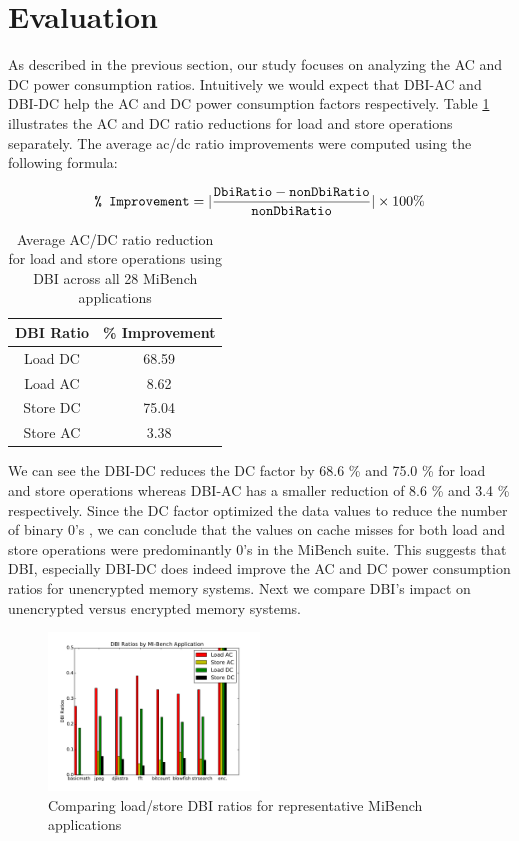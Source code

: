 \section{Evaluation}
\label{sec-evaluation}


As described in the previous section, our study focuses on analyzing the AC and
DC power consumption ratios. Intuitively we would expect that DBI-AC and DBI-DC
help the AC and DC power consumption factors respectively. Table
\ref{table:dbi-ratios} illustrates the AC and DC ratio reductions for load and
store operations separately. The average ac/dc ratio improvements were computed
using the following formula:

$$ \texttt{\% Improvement} = |\frac{\texttt{DbiRatio} - \texttt{nonDbiRatio}}{\texttt{nonDbiRatio}}| \times 100\%$$

\begin{table}[!htb]
  \centering
    \begin{tabular}{| c | c |}
      \hline
      \textbf{DBI Ratio} & \textbf{\% Improvement} \\ \hline
     Load DC  & 68.59 \\ \hline
     Load AC  & 8.62  \\ \hline
     Store DC & 75.04 \\ \hline
     Store AC & 3.38  \\ \hline
    \end{tabular}
    \caption{Average AC/DC ratio reduction for load and store operations using
    DBI across all 28 MiBench applications}
    \label{table:dbi-ratios}
\end{table}

We can see the DBI-DC reduces the DC factor by 68.6 \% and 75.0 \% for load and
store operations whereas DBI-AC has a smaller reduction of 8.6 \%
and 3.4 \% respectively. Since the DC factor optimized the data values to
reduce the number of binary $0$'s \cite{low-power-dram}, we can conclude that
the values on cache misses for both load and store operations were
predominantly $0$'s  in the MiBench suite. This suggests that DBI, especially
DBI-DC does indeed improve the AC and DC power consumption ratios for
unencrypted memory systems. Next we compare DBI's impact on unencrypted versus
encrypted memory systems.

\begin{figure}[!htb]
  \centering
  \includegraphics[width=0.5\textwidth]{figs/dbiGraph}
  \caption{Comparing load/store DBI ratios for representative MiBench applications}
  \label{fig:dbiGraph}
\end{figure}


